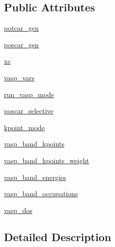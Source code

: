 \subsection*{Public Attributes}
\begin{DoxyCompactItemize}
\item 
\hyperlink{class_d_f_t___k_i_t_1_1calculator_1_1_v_a_s_p_1_1calculator___v_a_s_p_ac7f726a441b6200f52bbbd378d01105d}{potcar\+\_\+gen}
\item 
\hyperlink{class_d_f_t___k_i_t_1_1calculator_1_1_v_a_s_p_1_1calculator___v_a_s_p_ac9c343bf4710d1f4ce51e299b7fb3f79}{poscar\+\_\+gen}
\item 
\hyperlink{class_d_f_t___k_i_t_1_1calculator_1_1_v_a_s_p_1_1calculator___v_a_s_p_a25c8211618e29623de65dc025b7095ff}{xc}
\item 
\hyperlink{class_d_f_t___k_i_t_1_1calculator_1_1_v_a_s_p_1_1calculator___v_a_s_p_a6535b486e111047592053570cada1659}{vasp\+\_\+vars}
\item 
\hyperlink{class_d_f_t___k_i_t_1_1calculator_1_1_v_a_s_p_1_1calculator___v_a_s_p_a8038b8e1bef5a7cb6a06792b0ed46b3e}{run\+\_\+vasp\+\_\+mode}
\item 
\hyperlink{class_d_f_t___k_i_t_1_1calculator_1_1_v_a_s_p_1_1calculator___v_a_s_p_ace6520eb2ab26a11e22e612dbc8d7a23}{poscar\+\_\+selective}
\item 
\hyperlink{class_d_f_t___k_i_t_1_1calculator_1_1_v_a_s_p_1_1calculator___v_a_s_p_a30e1694ddf4600d64abe1fecf803594b}{kpoint\+\_\+mode}
\item 
\hyperlink{class_d_f_t___k_i_t_1_1calculator_1_1_v_a_s_p_1_1calculator___v_a_s_p_a80ffcac99b8d17e72afe45735140be30}{vasp\+\_\+band\+\_\+kpoints}
\item 
\hyperlink{class_d_f_t___k_i_t_1_1calculator_1_1_v_a_s_p_1_1calculator___v_a_s_p_a236f2e61144343eb38ec023c456cbba1}{vasp\+\_\+band\+\_\+kpoints\+\_\+weight}
\item 
\hyperlink{class_d_f_t___k_i_t_1_1calculator_1_1_v_a_s_p_1_1calculator___v_a_s_p_ad594df9f945783df593d6d1b758eea64}{vasp\+\_\+band\+\_\+energies}
\item 
\hyperlink{class_d_f_t___k_i_t_1_1calculator_1_1_v_a_s_p_1_1calculator___v_a_s_p_a72dac00b928af11c2eca1bc8abbeeeaf}{vasp\+\_\+band\+\_\+occupations}
\item 
\hyperlink{class_d_f_t___k_i_t_1_1calculator_1_1_v_a_s_p_1_1calculator___v_a_s_p_afd3b32eddf01b20ce15fbf7c30060434}{vasp\+\_\+dos}
\end{DoxyCompactItemize}


\subsection{Detailed Description}


